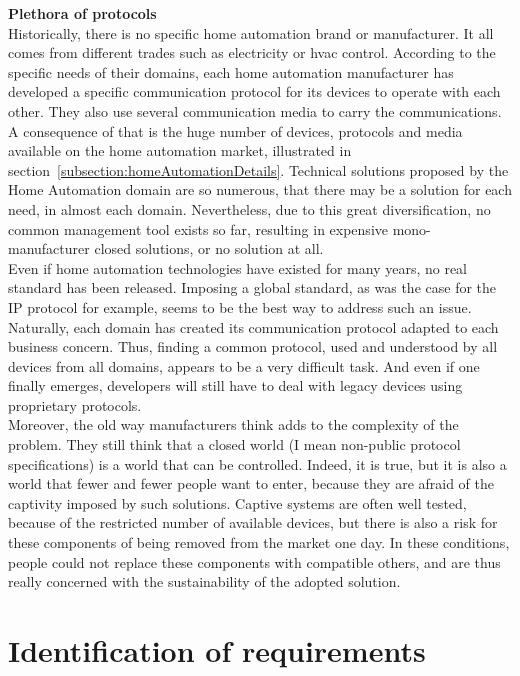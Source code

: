 {\bf Plethora of protocols}\\
Historically, there is no specific home automation brand or manufacturer. It all comes from different trades such as electricity or \gls{hvac} control. According to the specific needs of their domains, each home automation manufacturer has developed a specific communication protocol for its devices to operate with each other. They also use several communication media to carry the communications. A consequence of that is the huge number of devices, protocols and media available on the home automation market, illustrated in section~\ref{subsection:homeAutomationDetails}. 
Technical solutions proposed by the Home Automation domain are so numerous, that there may be a solution for each need, in almost each domain. Nevertheless, due to this great diversification, no common management tool exists so far, resulting in expensive mono-manufacturer closed solutions, or no solution at all.\\
Even if home automation technologies have existed for many years, no real standard has been released. Imposing a global standard, as was the case for the IP protocol for example, seems to be the best way to address such an issue. Naturally, each domain has created its communication protocol adapted to each business concern. Thus, finding a common protocol, used and understood by all devices from all domains, appears to be a very difficult task. And even if one finally emerges, developers will still have to deal with legacy devices using proprietary protocols.\\
Moreover, the old way manufacturers think adds to the complexity of the problem. They still think that a closed world (I mean non-public protocol specifications) is a world that can be controlled. Indeed, it is true, but it is also a world that fewer and fewer people want to enter, because they are afraid of the captivity imposed by such solutions. Captive systems are often well tested, because of the  restricted number of available devices, but there is also a risk for these components of being removed from the market one day. In these conditions, people could not replace these components with compatible others, and are thus really concerned with the sustainability of the adopted solution.\\



\section{Identification of requirements}
\label{ch:requirements}

